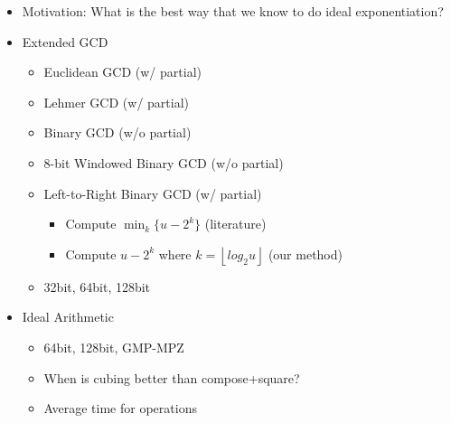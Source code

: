 \documentclass[11pt, letterpaper]{article}
\theoremstyle{definition}
\newcommand{\floor}[1]{\left\lfloor #1 \right\rfloor}
\begin{document}
\begin{itemize}
\item Motivation: What is the best way that we know to do ideal exponentiation?  

\item Extended GCD
	\begin{itemize}
	\item Euclidean GCD (w/ partial)
	\item Lehmer GCD (w/ partial)
	\item Binary GCD (w/o partial)
	\item 8-bit Windowed Binary GCD (w/o partial)
	\item Left-to-Right Binary GCD (w/ partial)
		\begin{itemize}
		\item Compute $\min_k \{ u-2^k \}$ (literature)
		\item Compute $u-2^k$ where $k=\floor{log_2 u}$ (our method)
		\end{itemize}
	\item 32bit, 64bit, 128bit
	\end{itemize}
	
	
\item Ideal Arithmetic
	\begin{itemize}
	\item 64bit, 128bit, GMP-MPZ
	\item When is cubing better than compose+square?
	\item Average time for operations
	\end{itemize}	
	

\end{itemize}
\end{document}
